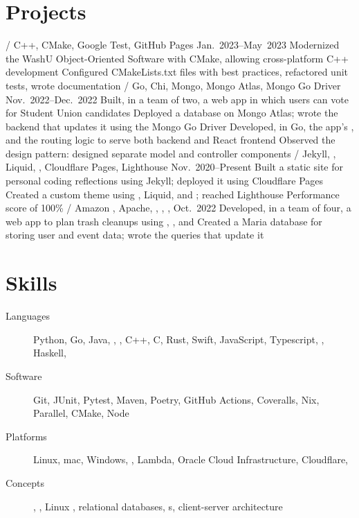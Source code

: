 \section{Projects}
\begin{outline}
     / C++, CMake, Google Test, GitHub Pages
    \hfill Jan.\ 2023--May\ 2023
        \1 Modernized the WashU Object-Oriented Software with CMake, allowing cross-platform C++ development
            \2 Configured CMakeLists.txt files with best practices, refactored unit tests, wrote documentation
     / Go, Chi, Mongo, Mongo Atlas, Mongo Go Driver
    \hfill Nov.\ 2022--Dec.\ 2022
        \1 Built, in a team of two, a web app in which users can vote for Student Union candidates
            \2 Deployed a database on Mongo Atlas; wrote the backend that updates it using the Mongo Go Driver
            \2 Developed, in Go, the app's  , and the routing logic to serve both backend and React frontend
            \2 Observed the  design pattern: designed separate model and controller components
     / Jekyll, , Liquid, , Cloudflare Pages, Lighthouse
    \hfill Nov.\ 2020--Present
        \1 Built a static site for personal coding reflections using Jekyll; deployed it using Cloudflare Pages
            \2 Created a custom theme using , Liquid, and ; reached Lighthouse Performance score of 100\%
     / Amazon , Apache, , , , 
    \hfill Oct.\ 2022
        \1 Developed, in a team of four, a web app to plan trash cleanups using , , and 
            \2 Created a Maria database for storing user and event data; wrote the  queries that update it
\end{outline}

\section{Skills}
\begin{description}
    \item [Languages] Python, Go, Java, , , C++, C, Rust, Swift, JavaScript, Typescript, , Haskell, \textsmaller{\LaTeX}
    \item [Software] Git, JUnit, Pytest, Maven, Poetry, GitHub Actions, Coveralls, Nix,  Parallel, CMake, Node
    \item [Platforms] Linux, mac, Windows, ,  Lambda, Oracle Cloud Infrastructure, Cloudflare, 
    \item [Concepts] , , Linux , relational databases, s, client-server architecture
\end{description}

